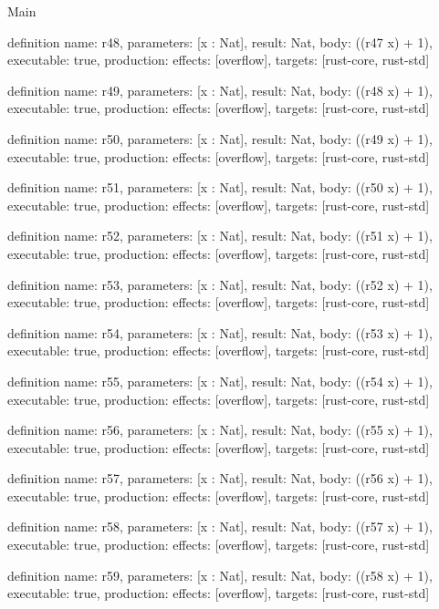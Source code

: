 \begin{lexlean}{Main}
\begin{semanticmodule}
definition{
  name: r48,
  parameters: [x : Nat],
  result: Nat,
  body: ((r47 x) + 1),
  executable: true,
  production: {effects: [overflow], targets: [rust-core, rust-std]}
}

definition{
  name: r49,
  parameters: [x : Nat],
  result: Nat,
  body: ((r48 x) + 1),
  executable: true,
  production: {effects: [overflow], targets: [rust-core, rust-std]}
}

definition{
  name: r50,
  parameters: [x : Nat],
  result: Nat,
  body: ((r49 x) + 1),
  executable: true,
  production: {effects: [overflow], targets: [rust-core, rust-std]}
}

definition{
  name: r51,
  parameters: [x : Nat],
  result: Nat,
  body: ((r50 x) + 1),
  executable: true,
  production: {effects: [overflow], targets: [rust-core, rust-std]}
}

definition{
  name: r52,
  parameters: [x : Nat],
  result: Nat,
  body: ((r51 x) + 1),
  executable: true,
  production: {effects: [overflow], targets: [rust-core, rust-std]}
}

definition{
  name: r53,
  parameters: [x : Nat],
  result: Nat,
  body: ((r52 x) + 1),
  executable: true,
  production: {effects: [overflow], targets: [rust-core, rust-std]}
}

definition{
  name: r54,
  parameters: [x : Nat],
  result: Nat,
  body: ((r53 x) + 1),
  executable: true,
  production: {effects: [overflow], targets: [rust-core, rust-std]}
}

definition{
  name: r55,
  parameters: [x : Nat],
  result: Nat,
  body: ((r54 x) + 1),
  executable: true,
  production: {effects: [overflow], targets: [rust-core, rust-std]}
}

definition{
  name: r56,
  parameters: [x : Nat],
  result: Nat,
  body: ((r55 x) + 1),
  executable: true,
  production: {effects: [overflow], targets: [rust-core, rust-std]}
}

definition{
  name: r57,
  parameters: [x : Nat],
  result: Nat,
  body: ((r56 x) + 1),
  executable: true,
  production: {effects: [overflow], targets: [rust-core, rust-std]}
}

definition{
  name: r58,
  parameters: [x : Nat],
  result: Nat,
  body: ((r57 x) + 1),
  executable: true,
  production: {effects: [overflow], targets: [rust-core, rust-std]}
}

definition{
  name: r59,
  parameters: [x : Nat],
  result: Nat,
  body: ((r58 x) + 1),
  executable: true,
  production: {effects: [overflow], targets: [rust-core, rust-std]}
}


\end{semanticmodule}
\end{lexlean}
